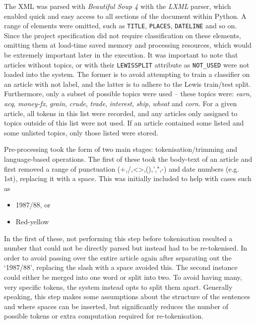 \documentclass[11pt]{article}
\begin{document}
The XML was parsed with \textit{Beautiful Soup 4} with the \textit{LXML} parser, which enabled quick and easy access to all sections of the document within Python. A range of elements were omitted, such as \texttt{TITLE}, \texttt{PLACES}, \texttt{DATELINE} and so on. Since the project specification did not require classification on these elements, omitting them at load-time saved memory and processing resources, which would be extremely important later in the execution. It was important to note that articles without topics, or with their \texttt{LEWISSPLIT} attribute as \texttt{NOT\_USED} were not loaded into the system. The former is to avoid attempting to train a classifier on an article with not label, and the latter is to adhere to the Lewis train/test split. Furthermore, only a subset of possible topics were used – these topics were: \textit{earn}, \textit{acq}, \textit{money-fx}, \textit{grain}, \textit{crude}, \textit{trade}, \textit{interest}, \textit{ship}, \textit{wheat} and \textit{corn}. For a given article, all tokens in this list were recorded, and any articles only assigned to topics outside of this list were not used. If an article contained some listed and some unlisted topics, only those listed were stored.

Pre-processing took the form of two main stages: tokenisation/trimming and language-based operations. The first of these took the body-text of an article and first removed a range of punctuation (+,/,\textless\textgreater,(),',",-) and date numbers (e.g. 1st), replacing it with a space. This was initially included to help with cases such as
\begin{itemize}
\item 1987/88, or
\item Red-yellow
\end{itemize}
In the first of these, not performing this step before tokenisation resulted a number that could not be directly parsed but instead had to be re-tokenised. In order to avoid passing over the entire article again after separating out the `1987/88', replacing the slash with a space avoided this. The second instance could either be merged into one word or split into two. To avoid having many, very specific tokens, the system instead opts to split them apart. Generally speaking, this step makes some assumptions about the structure of the sentences and where spaces can be inserted, but significantly reduces the number of possible tokens or extra computation required for re-tokenisation.
\end{document}
